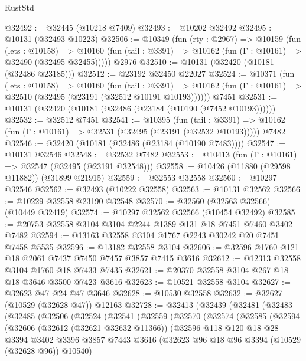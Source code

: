 \begin{lexlean}{RustStd}
\begin{coremodule}
@32492 := @32445 (@10218 @7409)
@32493 := @10202 @32492
@32495 := @10131 (@32493 @10223)
@32506 := @10349
    (fun (rty : @2967) =>
    @10159
      (fun (lets : @10158) =>
      @10160 (fun (tail : @3391) => @10162 (fun (Γ : @10161) => @32490 (@32495 @32455)))))
    @2976
@32510 := @10131 (@32420 (@10181 (@32486 @23185)))
@32512 := @23192 @32450 @22027
@32524 := @10371
    (fun (lets : @10158) =>
    @10160
      (fun (tail : @3391) =>
      @10162 (fun (Γ : @10161) => @32510 (@32495 (@23191 (@32512 @10191 @10193))))))
    @7451
@32531 := @10131 (@32420 (@10181 (@32486 (@23184 (@10190 (@7452 @10193))))))
@32532 := @32512 @7451
@32541 := @10395
    (fun (tail : @3391) => @10162 (fun (Γ : @10161) => @32531 (@32495 (@23191 (@32532 @10193)))))
    @7482
@32546 := @32420 (@10181 (@32486 (@23184 (@10190 @7483))))
@32547 := @10131 @32546
@32548 := @32532 @7482
@32553 := @10413 (fun (Γ : @10161) => @32547 (@32495 (@23191 @32548)))
@32558 := @10426 (@11880 (@29598 @11882)) (@31899 @21915)
@32559 := @32553 @32558
@32560 := @10297 @32546
@32562 := @32493 (@10222 @32558)
@32563 := @10131 @32562
@32566 := @10229 @32558 @23190 @32548
@32570 := @32560 (@32563 @32566) (@10449 @32419)
@32574 := @10297 @32562 @32566 (@10454 @32492)
@32585 := @20753 @32558 @3104 @3104 @2244 @1389 @131 @18 @7451 @7460 @3402 @7482
@32594 := @13163 @32558 @3104 @1767 @2243 @30242 @20 @7451 @7458 @5535
@32596 := @13182 @32558 @3104
@32606 := @32596 @1760 @121 @18 @2061 @7437 @7450 @7457 @3857 @7415 @3616
@32612 := @12313 @32558 @3104 @1760 @18 @7433 @7435
@32621 := @20370 @32558 @3104 @267 @18 @18 @3646 @3500 @7423 @3616
@32623 := @10521 @32558 @3104
@32627 := @32623 @47 @24 @47 @3646
@32628 := @10530 @32558
@32632 := @32627 (@10529 (@32628 @47)) @12163
@32728 := @32413
    (@32439
      (@32481
        (@32483
          (@32485
            (@32506
              (@32524
                (@32541
                  (@32559
                    (@32570
                      (@32574
                        (@32585
                          (@32594
                            (@32606
                              (@32612 (@32621 @32632 @11366))
                              (@32596
                                @118
                                @120
                                @18
                                @28
                                @3394
                                @3402
                                @3396
                                @3857
                                @7443
                                @3616
                                (@32623 @96 @18 @96 @3394 (@10529 (@32628 @96)) @10540)

\end{coremodule}
\end{lexlean}
